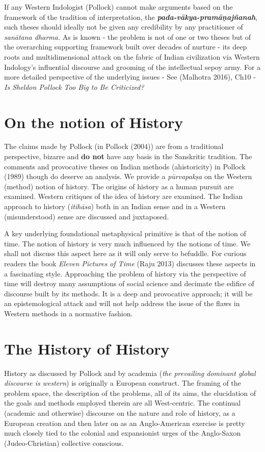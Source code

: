 If any Western Indologist (Pollock) cannot make arguments based on the framework of the tradition of interpretation, the \textit{\textbf{pada-vākya-pramāṇajñanah}}, such theses should ideally not be given any credibility by any practitioner of \textit{sanātana dharma.} As is known - the problem is not of one or two theses but of the overarching supporting framework built over decades of nurture - its deep roots and multidimensional attack on the fabric of Indian civilization via Western Indology’s influential discourse and grooming of the intellectual sepoy army. For a more detailed perspective of the underlying issues - See (Malhotra 2016), Ch10 - \textit{Is Sheldon Pollock Too Big to Be Criticized?}


\section*{On the notion of History}

The claims made by Pollock (in Pollock (2004)) are from a traditional perspective, bizarre and \textbf{do not} have any basis in the Sanskritic tradition. The comments and provocative theses on Indian methods (ahistoricity) in Pollock (1989) though do deserve an analysis. We provide a \textit{pūrvapakṣa} on the Western (method) notion of history. The origins of history as a human pursuit are examined. Western critiques of the idea of history are examined. The Indian approach to history (\textit{itihāsa}) both in an Indian sense and in a Western (misunderstood) sense are discussed and juxtaposed.

A key underlying foundational metaphysical primitive is that of the notion of time. The notion of history is very much influenced by the notions of time. We shall not discuss this aspect here as it will only serve to befuddle. For curious readers the book \textit{Eleven Pictures of Time} (Raju 2013) discusses these aspects in a fascinating style. Approaching the problem of history via the perspective of time will destroy many assumptions of social science and decimate the edifice of discourse built by its methods. It is a deep and provocative approach; it will be an epistemological attack and will not help address the issue of the flaws in Western methods in a normative fashion.


\section*{The History of History}

History as discussed by Pollock and by academia (\textit{the prevailing dominant global discourse is western}) is originally a European construct. The framing of the problem space, the description of the problems, all of its aims, the elucidation of the goals and methods employed therein are all West-centric. The continual (academic and otherwise) discourse on the nature and role of history, as a European creation and then later on as an Anglo-American exercise is pretty much closely tied to the colonial and expansionist urges of the Anglo-Saxon (Judeo-Christian) collective conscious.

